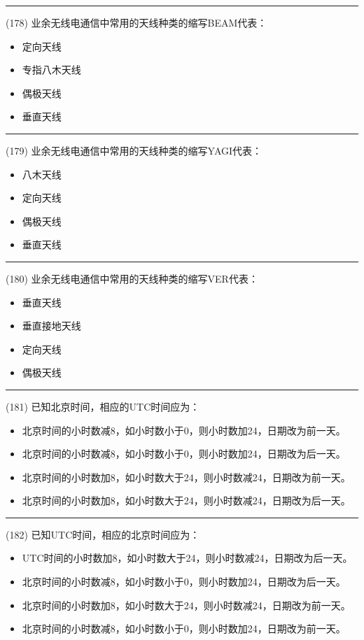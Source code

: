 \documentclass[twocolumn]{ctexart}  %
\begin{document}
\noindent\rule{0.5\textwidth}{1pt}
\heiti (178) 业余无线电通信中常用的天线种类的缩写BEAM代表： \songti {\color{gray} [LK0408] }
\begin{itemize}
	\item  定向天线
	\item  专指八木天线
	\item  偶极天线
	\item  垂直天线
\end{itemize}


\noindent\rule{0.5\textwidth}{1pt}
\heiti (179) 业余无线电通信中常用的天线种类的缩写YAGI代表： \songti {\color{gray} [LK0409] }
\begin{itemize}
	\item  八木天线
	\item  定向天线
	\item  偶极天线
	\item  垂直天线
\end{itemize}


\noindent\rule{0.5\textwidth}{1pt}
\heiti (180) 业余无线电通信中常用的天线种类的缩写VER代表： \songti {\color{gray} [LK0410] }
\begin{itemize}
	\item  垂直天线
	\item  垂直接地天线
	\item  定向天线
	\item  偶极天线
\end{itemize}


\noindent\rule{0.5\textwidth}{1pt}
\heiti (181) 已知北京时间，相应的UTC时间应为： \songti {\color{gray} [LK0193] }
\begin{itemize}
	\item  北京时间的小时数减8，如小时数小于0，则小时数加24，日期改为前一天。
	\item  北京时间的小时数减8，如小时数小于0，则小时数加24，日期改为后一天。
	\item  北京时间的小时数加8，如小时数大于24，则小时数减24，日期改为前一天。
	\item  北京时间的小时数加8，如小时数大于24，则小时数减24，日期改为后一天。
\end{itemize}


\noindent\rule{0.5\textwidth}{1pt}
\heiti (182) 已知UTC时间，相应的北京时间应为： \songti {\color{gray} [LK0194] }
\begin{itemize}
	\item  UTC时间的小时数加8，如小时数大于24，则小时数减24，日期改为后一天。
	\item  北京时间的小时数减8，如小时数小于0，则小时数加24，日期改为后一天。
	\item  北京时间的小时数加8，如小时数大于24，则小时数减24，日期改为前一天。
	\item  北京时间的小时数减8，如小时数小于0，则小时数加24，日期改为前一天。
\end{itemize}
\end{document}
